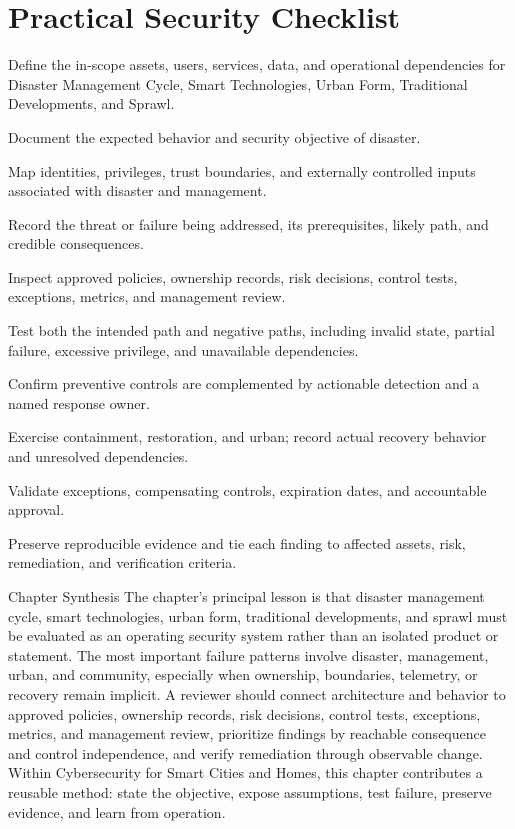 \documentclass[11pt,letterpaper]{article}
\begin{document}
\section*{Practical Security Checklist}
\begin{CornellChecklist}
\item Define the in-scope assets, users, services, data, and operational dependencies for Disaster Management Cycle, Smart Technologies, Urban Form, Traditional Developments, and Sprawl.
\item Document the expected behavior and security objective of disaster.
\item Map identities, privileges, trust boundaries, and externally controlled inputs associated with disaster and management.
\item Record the threat or failure being addressed, its prerequisites, likely path, and credible consequences.
\item Inspect approved policies, ownership records, risk decisions, control tests, exceptions, metrics, and management review.
\item Test both the intended path and negative paths, including invalid state, partial failure, excessive privilege, and unavailable dependencies.
\item Confirm preventive controls are complemented by actionable detection and a named response owner.
\item Exercise containment, restoration, and urban; record actual recovery behavior and unresolved dependencies.
\item Validate exceptions, compensating controls, expiration dates, and accountable approval.
\item Preserve reproducible evidence and tie each finding to affected assets, risk, remediation, and verification criteria.
\end{CornellChecklist}
\begin{CornellSummaryBox}{Chapter Synthesis}
The chapter's principal lesson is that disaster management cycle, smart technologies, urban form, traditional developments, and sprawl must be evaluated as an operating security system rather than an isolated product or statement. The most important failure patterns involve disaster, management, urban, and community, especially when ownership, boundaries, telemetry, or recovery remain implicit. A reviewer should connect architecture and behavior to approved policies, ownership records, risk decisions, control tests, exceptions, metrics, and management review, prioritize findings by reachable consequence and control independence, and verify remediation through observable change. Within Cybersecurity for Smart Cities and Homes, this chapter contributes a reusable method: state the objective, expose assumptions, test failure, preserve evidence, and learn from operation.
\end{CornellSummaryBox}
\end{document}
